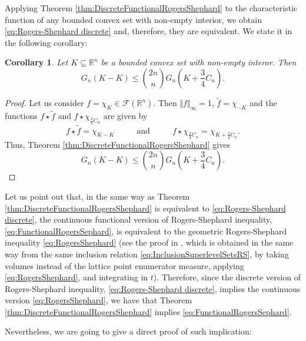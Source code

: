 \documentclass{amsart}
\newcommand{\R}{\mathbb R}
\newtheorem{cor}{Corollary}[section]
\theoremstyle{remark}
\theoremstyle{definition}
\numberwithin{equation}{section}
\begin{document}
Applying Theorem \ref{thm:DiscreteFunctionalRogersShephard} to the characteristic function of any bounded convex set with non-empty interior, we obtain \eqref{eq:Rogers-Shephard discrete} and, therefore, they are equivalent. We state it in the following corollary:

\begin{cor}
Let $K\subseteq\R^n$ be a bounded convex set with non-empty interor. Then
$$
G_n(K-K) \leq \binom{2n}{n} G_n \left( K+ \frac{3}{4}C_n \right).
$$
\end{cor}

\begin{proof}
Let us consider $f=\chi_K\in\mathcal{F}(\R^n)$. Then $\Vert f\Vert_\infty=1$, $\tilde{f}=\chi_{-K}$ and the functions $f\star\tilde{f}$ and $f\star\chi_{\frac{3}{4}C_n}$ are given by
$$
f\star\tilde{f}=\chi_{K-K}\hspace{1cm}\textrm{ and }\hspace{1cm}f\star\chi_{\frac{3}{4}C_n}=\chi_{K+\frac{3}{4}C_n}.
$$
Thus, Theorem \ref{thm:DiscreteFunctionalRogersShephard} gives
$$
G_n(K-K) \leq \binom{2n}{n} G_n \left(K+ \frac{3}{4}C_n \right).
$$
\end{proof}

Let us point out that, in the same way as Theorem \ref{thm:DiscreteFunctionalRogersShephard} is equivalent to \eqref{eq:Rogers-Shephard discrete}, the continuous functional version of Rogers-Shephard inequality, \eqref{eq:FunctionalRogersSephard}, is equivalent to the geometric Rogers-Shephard inequality \eqref{eq:RogersShephard} (see the proof in \cite[Thm. 2.2]{AGJV1}, which is obtained in the same way from the same inclusion relation \eqref{eq:InclusionSuperlevelSetsRS}, by taking volumes instead of the lattice point enumerator measure, applying \eqref{eq:RogersShephard}, and integrating in $t$). Therefore, since the discrete version of Rogers-Shephard inequality, \eqref{eq:Rogers-Shephard discrete}, implies the continuous version \eqref{eq:RogersShephard}, we have that Theorem \ref{thm:DiscreteFunctionalRogersShephard} implies \eqref{eq:FunctionalRogersSephard}.

Nevertheless, we are going to give a direct proof of such implication:

\end{document}
